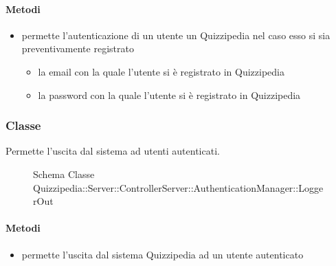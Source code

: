 \paragraph{Metodi}
\begin{itemize}
\item {}
\newline
permette l'autenticazione di un utente un Quizzipedia nel caso esso si sia preventivamente registrato
\newline
{}
\newline
\begin{itemize}
\item {}
\newline
la email con la quale l'utente si è registrato in Quizzipedia
\item {}
\newline
la password con la quale l'utente si è registrato in Quizzipedia
\end{itemize}
\end{itemize}
\subsubsection{Classe }
Permette l'uscita dal sistema ad utenti autenticati.
\begin{figure}[H]
\centering
\noindent{}
\caption[Schema Classe LoggerOut]{Schema Classe Quizzipedia::Server::ControllerServer::AuthenticationManager::LoggerOut}
\end{figure}
\paragraph{Metodi}
\begin{itemize}
\item {}
\newline
permette l'uscita dal sistema Quizzipedia ad un utente autenticato
\newline
\end{itemize}
